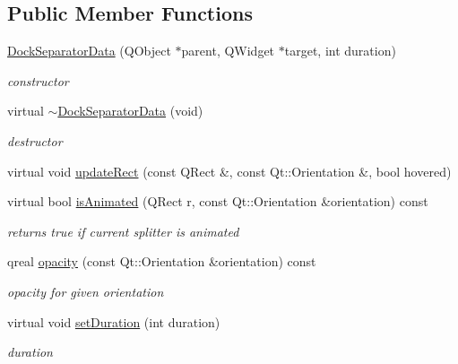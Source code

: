 \subsection*{Public Member Functions}
\begin{DoxyCompactItemize}
\item 
\mbox{\label{class_dock_separator_data_a3e13232d5ad39b2cf71ec63163cf5c20}} 
\hyperlink{class_dock_separator_data_a3e13232d5ad39b2cf71ec63163cf5c20}{Dock\+Separator\+Data} (Q\+Object $\ast$parent, Q\+Widget $\ast$target, int duration)
\begin{DoxyCompactList}\small\item\em constructor \end{DoxyCompactList}\item 
\mbox{\label{class_dock_separator_data_ab25c67075bae22a2d16d47d2d22b683d}} 
virtual \hyperlink{class_dock_separator_data_ab25c67075bae22a2d16d47d2d22b683d}{$\sim$\+Dock\+Separator\+Data} (void)
\begin{DoxyCompactList}\small\item\em destructor \end{DoxyCompactList}\item 
virtual void \hyperlink{class_dock_separator_data_a03604d5af7ac81a5351a08424a248830}{update\+Rect} (const Q\+Rect \&, const Qt\+::\+Orientation \&, bool hovered)
\item 
\mbox{\label{class_dock_separator_data_aa6c812562c9efcfa291927132966512c}} 
virtual bool \hyperlink{class_dock_separator_data_aa6c812562c9efcfa291927132966512c}{is\+Animated} (Q\+Rect r, const Qt\+::\+Orientation \&orientation) const
\begin{DoxyCompactList}\small\item\em returns true if current splitter is animated \end{DoxyCompactList}\item 
\mbox{\label{class_dock_separator_data_a78f588386698013d8b657559e3896b67}} 
qreal \hyperlink{class_dock_separator_data_a78f588386698013d8b657559e3896b67}{opacity} (const Qt\+::\+Orientation \&orientation) const
\begin{DoxyCompactList}\small\item\em opacity for given orientation \end{DoxyCompactList}\item 
\mbox{\label{class_dock_separator_data_a26a8aa665b77790f7c3f0f082cb9aee7}} 
virtual void \hyperlink{class_dock_separator_data_a26a8aa665b77790f7c3f0f082cb9aee7}{set\+Duration} (int duration)
\begin{DoxyCompactList}\small\item\em duration \end{DoxyCompactList}\end{DoxyCompactItemize}
